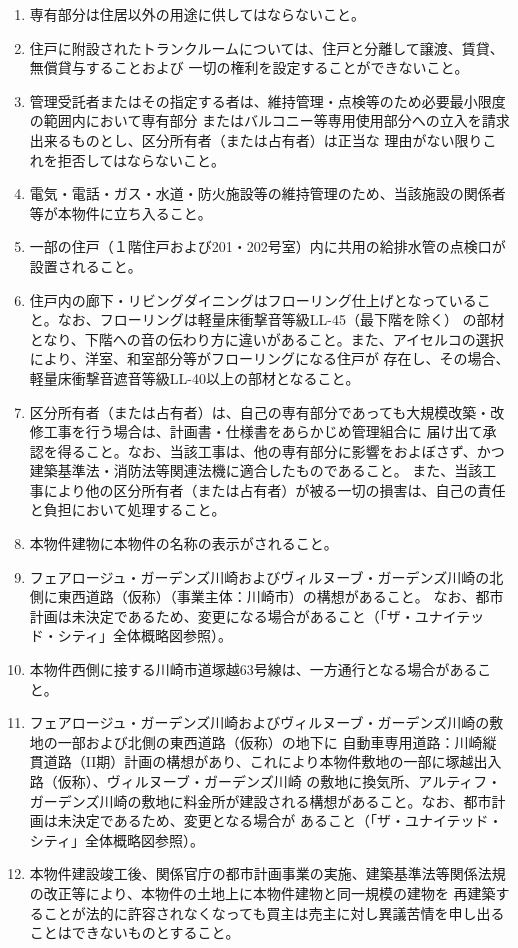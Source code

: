 \documentclass[
  luatex,
  paper=a4paper,
  fontsize=11pt,
  jafontsize=10pt,
  jlreq_notes,
]{jlreq}
\begin{document}
  \begin{enumerate}
  \item 専有部分は住居以外の用途に供してはならないこと。
  \item 住戸に附設されたトランクルームについては、住戸と分離して譲渡、賃貸、無償貸与することおよび
        一切の権利を設定することができないこと。
  \item 管理受託者またはその指定する者は、維持管理・点検等のため必要最小限度の範囲内において専有部分
        またはバルコニー等専用使用部分への立入を請求出来るものとし、区分所有者（または占有者）は正当な
        理由がない限りこれを拒否してはならないこと。
  \item 電気・電話・ガス・水道・防火施設等の維持管理のため、当該施設の関係者等が本物件に立ち入ること。
  \item 一部の住戸（１階住戸および201・202号室）内に共用の給排水管の点検口が設置されること。
  \item 住戸内の廊下・リビングダイニングはフローリング仕上げとなっていること。なお、フローリングは軽量床衝撃音等級LL-45（最下階を除く）
        の部材となり、下階への音の伝わり方に違いがあること。また、アイセルコの選択により、洋室、和室部分等がフローリングになる住戸が
        存在し、その場合、軽量床衝撃音遮音等級LL-40以上の部材となること。
  \item 区分所有者（または占有者）は、自己の専有部分であっても大規模改築・改修工事を行う場合は、計画書・仕様書をあらかじめ管理組合に
        届け出て承認を得ること。なお、当該工事は、他の専有部分に影響をおよぼさず、かつ建築基準法・消防法等関連法機に適合したものであること。
        また、当該工事により他の区分所有者（または占有者）が被る一切の損害は、自己の責任と負担において処理すること。
  \item 本物件建物に本物件の名称の表示がされること。
  \item フェアロージュ・ガーデンズ川崎およびヴィルヌーブ・ガーデンズ川崎の北側に東西道路（仮称）（事業主体：川崎市）の構想があること。
        なお、都市計画は未決定であるため、変更になる場合があること（「ザ・ユナイテッド・シティ」全体概略図参照）。
  \item 本物件西側に接する川崎市道塚越63号線は、一方通行となる場合があること。
  \item フェアロージュ・ガーデンズ川崎およびヴィルヌーブ・ガーデンズ川崎の敷地の一部および北側の東西道路（仮称）の地下に
        自動車専用道路：川崎縦貫道路（II期）計画の構想があり、これにより本物件敷地の一部に塚越出入路（仮称）、ヴィルヌーブ・ガーデンズ川崎
        の敷地に換気所、アルティフ・ガーデンズ川崎の敷地に料金所が建設される構想があること。なお、都市計画は未決定であるため、変更となる場合が
        あること（「ザ・ユナイテッド・シティ」全体概略図参照）。
  \item 本物件建設竣工後、関係官庁の都市計画事業の実施、建築基準法等関係法規の改正等により、本物件の土地上に本物件建物と同一規模の建物を
        再建築することが法的に許容されなくなっても買主は売主に対し異議苦情を申し出ることはできないものとすること。
  

\end{enumerate}
\end{document}

